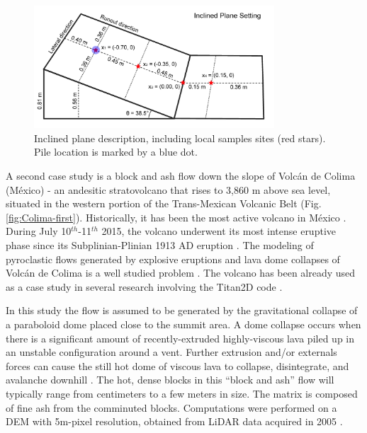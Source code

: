 \documentclass{article}
\begin{document}
\begin{figure}[H]
    \includegraphics[width=0.8\textwidth]{inclPlaneFig.jpg}
    \centering
    \caption{Inclined plane description, including local samples sites (red stars). Pile location is marked by a blue dot.}
    \label{fig:Ramp-first}
\end{figure}

A second case study is a block and ash flow down the slope of Volc{\'a}n de Colima (M{\'e}xico) - an andesitic stratovolcano that rises to 3,860 m above sea level, situated in the western portion of the Trans-Mexican Volcanic Belt (Fig. \ref{fig:Colima-first}). Historically, it has been the most active volcano in M{\'e}xico \citep{DeLaCruzReina1993, Zobin2002, Gonzalez2002}. During July 10$^{th}$-11$^{th}$ 2015, the volcano underwent its most intense eruptive phase since its Subplinian-Plinian 1913 AD eruption \citep{Saucedo2010, Zobin2015, ReyesDaVilla2016, Capra2016}. The modeling of pyroclastic flows generated by explosive eruptions and lava dome collapses of Volc{\'a}n de Colima is a well studied problem \citep{DelPozzo1995,Sheridan1995,Saucedo2002,Saucedo2004,Saucedo2005, Sarocchi2011, Capra2015}. The volcano has been already used as a case study in several research involving the Titan2D code \citep{Rupp2004, Rupp2006, Dalbey2008, Yu2009, Sulpizio2010, Capra2011, Aghakhani2016}.

In this study the flow is assumed to be generated by the gravitational collapse of a paraboloid dome placed close to the summit area. A dome collapse occurs when there is a significant amount of recently-extruded highly-viscous lava piled up in an unstable configuration around a vent. Further extrusion and/or externals forces can cause the still hot dome of viscous lava to collapse, disintegrate, and avalanche downhill \citep{Bursik2005}. The hot, dense blocks in this ``block and ash'' flow will typically range from centimeters to a few meters in size. The matrix is composed of fine ash from the comminuted blocks. Computations were performed on a DEM with 5m-pixel resolution, obtained from LiDAR data acquired in 2005 \citep{Davila2007, Sulpizio2010}.
\end{document}
